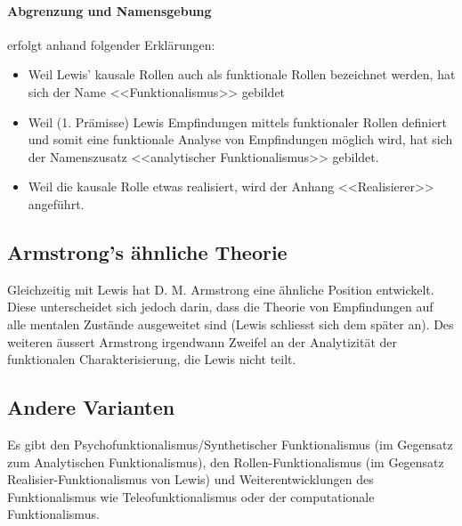 \documentclass[../main.tex]{subfiles}
\begin{document}
\paragraph{Abgrenzung und Namensgebung} erfolgt anhand folgender Erklärungen: 
\begin{itemize}
	\item Weil Lewis' kausale Rollen auch als funktionale Rollen bezeichnet werden, hat sich der Name <<Funktionalismus>> gebildet
	\item Weil (1. Prämisse) Lewis Empfindungen mittels funktionaler Rollen definiert und somit eine funktionale Analyse von Empfindungen möglich wird, hat sich der Namenszusatz <<analytischer Funktionalismus>> gebildet.
	\item Weil die kausale Rolle etwas realisiert, wird der Anhang <<Realisierer>> angeführt. 
\end{itemize}


\subsection{Armstrong's ähnliche Theorie}
Gleichzeitig mit Lewis hat D. M. Armstrong eine ähnliche Position entwickelt. Diese unterscheidet sich jedoch darin, dass die Theorie von Empfindungen auf alle mentalen Zustände ausgeweitet sind (Lewis schliesst sich dem später an). Des weiteren äussert Armstrong irgendwann Zweifel an der Analytizität der funktionalen Charakterisierung, die Lewis nicht teilt. 

\subsection{Andere Varianten}
Es gibt den Psychofunktionalismus/Synthetischer Funktionalismus (im Gegensatz zum Analytischen Funktionalismus), den Rollen-Funktionalismus (im Gegensatz Realisier-Funktionalismus von Lewis) und Weiterentwicklungen des Funktionalismus wie Teleofunktionalismus oder der computationale Funktionalismus. 
\end{document}

